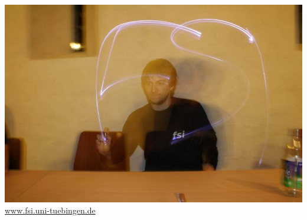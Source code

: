 \documentclass{beamer}
\begin{document}
	\begin{frame}
		\includegraphics[width=\linewidth]{fsi-manu.png}
		\vspace*{2mm}\\
		{\centering\url{www.fsi.uni-tuebingen.de}}
	\end{frame}
\end{document}
